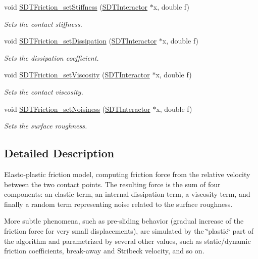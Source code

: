 \begin{DoxyCompactItemize}
void \hyperlink{group__friction_ga521b1a9cf85934f1aa9a2fd5b54c7e8c}{S\+D\+T\+Friction\+\_\+set\+Stiffness} (\hyperlink{group__interactor_gacd68aba5c96532193d9cbc8dfa8f1c8c}{S\+D\+T\+Interactor} $\ast$x, double f)
\begin{DoxyCompactList}\small\item\em Sets the contact stiffness. \end{DoxyCompactList}\item 
void \hyperlink{group__friction_ga7aa2f93cea56ec41fee77ccce15ec772}{S\+D\+T\+Friction\+\_\+set\+Dissipation} (\hyperlink{group__interactor_gacd68aba5c96532193d9cbc8dfa8f1c8c}{S\+D\+T\+Interactor} $\ast$x, double f)
\begin{DoxyCompactList}\small\item\em Sets the dissipation coefficient. \end{DoxyCompactList}\item 
void \hyperlink{group__friction_gabd224dee530d500917b721bbaecfd103}{S\+D\+T\+Friction\+\_\+set\+Viscosity} (\hyperlink{group__interactor_gacd68aba5c96532193d9cbc8dfa8f1c8c}{S\+D\+T\+Interactor} $\ast$x, double f)
\begin{DoxyCompactList}\small\item\em Sets the contact viscosity. \end{DoxyCompactList}\item 
void \hyperlink{group__friction_ga4ceea5e4a10d144080074dd3f9551a7c}{S\+D\+T\+Friction\+\_\+set\+Noisiness} (\hyperlink{group__interactor_gacd68aba5c96532193d9cbc8dfa8f1c8c}{S\+D\+T\+Interactor} $\ast$x, double f)
\begin{DoxyCompactList}\small\item\em Sets the surface roughness. \end{DoxyCompactList}\end{DoxyCompactItemize}


\subsection{Detailed Description}
Elasto-\/plastic friction model, computing friction force from the relative velocity between the two contact points. The resulting force is the sum of four components\+: an elastic term, an internal dissipation term, a viscosity term, and finally a random term representing noise related to the surface roughness.

More subtle phenomena, such as pre-\/sliding behavior (gradual increase of the friction force for very small displacements), are simulated by the \char`\"{}plastic\char`\"{} part of the algorithm and parametrized by several other values, such as static/dynamic friction coefficients, break-\/away and Stribeck velocity, and so on.

